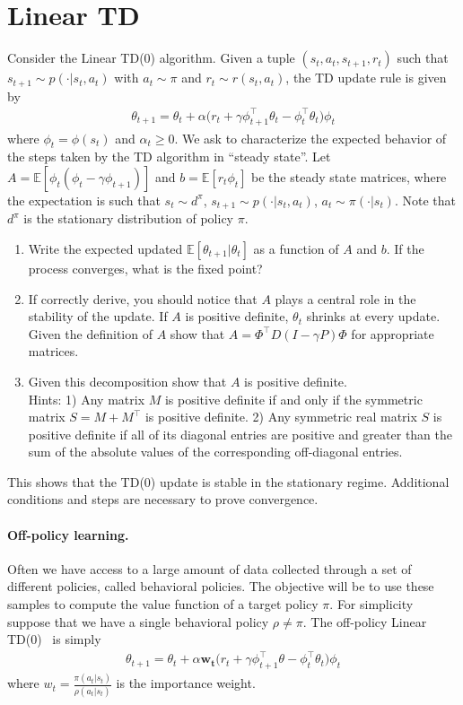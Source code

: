 \documentclass[a4paper]{article}
\newcommand{\transp}{\intercal}
\begin{document}
\section{Linear TD}
Consider the Linear TD(0) algorithm. Given a tuple $(s_t, a_t, s_{t+1}, r_t)$ such that $s_{t+1} \sim p(\cdot| s_t,a_t)$ with $a_t \sim  \pi$ and $r_t \sim r(s_t, a_t)$, the TD update rule is given by
\begin{align*}
    \theta_{t+1} = \theta_t + \alpha \Big(r_t + \gamma \phi_{t+1}^\transp \theta_t - \phi_t^\transp \theta_t\Big) \phi_t
\end{align*}
where $\phi_t = \phi(s_t)$ and $\alpha_t \geq  0$.
We ask to characterize the expected behavior of the steps taken by the TD algorithm in ``steady state''.
Let $A = \mathbb{E}[\phi_t(\phi_t  - \gamma \phi_{t+1})]$ and $b = \mathbb{E}[r_t \phi_t]$ be the steady state matrices, where the expectation is such that $s_t \sim d^{\pi}$, $s_{t+1} \sim p(\cdot| s_t, a_t)$,  $a_t \sim \pi(\cdot|s_t)$. Note that $d^{\pi}$ is the stationary distribution of policy $\pi$.
\begin{enumerate}
    \item Write the expected updated $\mathbb{E}[\theta_{t+1}| \theta_t]$ as a function of  $A$ and $b$. If the process converges, what is the fixed point?
    \item If correctly derive, you should notice that $A$ plays a central role in the stability of the update. If  $A$ is positive definite, $\theta_t$ shrinks at every update. Given the definition of $A$ show that $A = \Phi^\transp D (I - \gamma P) \Phi$ for appropriate matrices.
    \item Given this decomposition show that $A$ is positive definite.\\
    Hints: 1) Any matrix $M$ is positive definite if and only if the symmetric matrix $S = M + M^\transp$ is positive definite. 
    2) Any symmetric real matrix $S$ is positive definite if all of its diagonal entries are positive and greater
    than the sum of the absolute values of the corresponding off-diagonal entries.
\end{enumerate}
This shows that the TD(0) update is stable in the stationary regime. Additional conditions and steps are necessary to prove convergence.


\paragraph{Off-policy learning.}
Often we have access to a large amount of data collected through a set of different policies, called behavioral policies.
The objective will be to use these samples to compute the value function of a target policy $\pi$. For simplicity suppose that we have a single behavioral policy $\rho \neq \pi$. 
The off-policy Linear TD(0)~\citep{PrecupSD01} is simply
\begin{align}\label{eq:offtdlin}
    \theta_{t+1} = \theta_t + \alpha \boldsymbol{w_t} \Big(r_t + \gamma \phi_{t+1}^\transp \theta - \phi_t^\transp \theta_t\Big) \phi_t
\end{align}
where $w_t = \frac{\pi(a_t|s_t)}{\rho(a_t|s_t)}$ is the importance weight.
\end{document}
